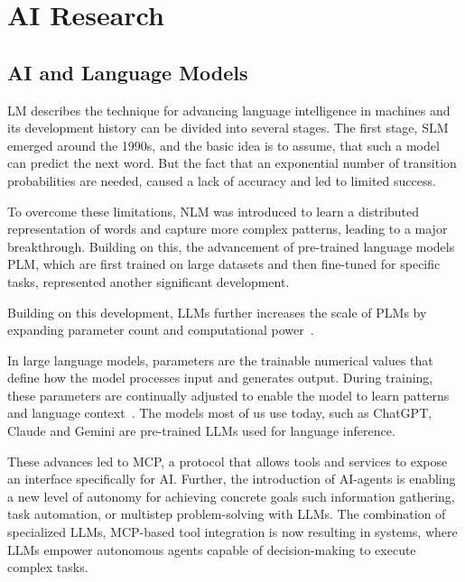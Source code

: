 \section{AI Research}\label{sec:ai-research}

\subsection{AI and Language Models}\label{subsec:ai-and-language-model}

\gls{LM} describes the technique for advancing language intelligence in machines and its development history can be divided into several stages.
The first stage, \gls{SLM} emerged around the 1990s, and the basic idea is to assume, that such a model can predict the next word.
But the fact that an exponential number of transition probabilities are needed, caused a lack of accuracy and led to limited success.

To overcome these limitations, \gls{NLM} was introduced to learn a distributed representation of words and capture more complex patterns, leading to a major breakthrough.
Building on this, the advancement of pre-trained language models \gls{PLM}, which are first trained on large datasets and then fine-tuned for specific tasks, represented another significant development.

Building on this development, \gls{LLM}s further increases the scale of \gls{PLM}s by expanding parameter count and computational power~\cite{zhao2023survey}.

In large language models, parameters are the trainable numerical values that define how the model processes input and generates output.
During training, these parameters are continually adjusted to enable the model to learn patterns and language context~\cite{shoeybi2020megatronlmtrainingmultibillionparameter}.
The models most of us use today, such as ChatGPT, Claude and Gemini are pre-trained \gls{LLM}s used for language inference.

These advances led to \gls{MCP}, a protocol that allows tools and services to expose an interface specifically for \gls{AI}.
Further, the introduction of \gls{AI}-agents is enabling a new level of autonomy for achieving concrete goals such information gathering, task automation, or multistep problem-solving with \gls{LLM}s.
The combination of specialized \gls{LLM}s, \gls{MCP}-based tool integration is now resulting in systems, where \gls{LLM}s empower autonomous agents capable of decision-making to execute complex tasks.

